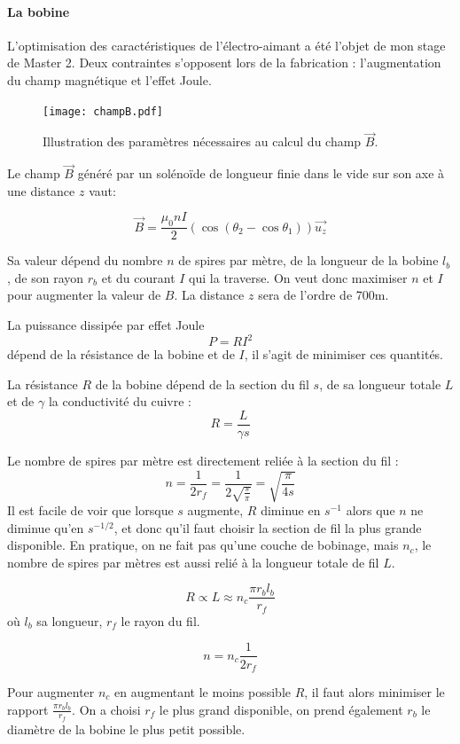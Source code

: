 \paragraph{La bobine}

	L'optimisation des caractéristiques de l'électro-aimant a été l'objet de mon stage de Master 2. 
	Deux contraintes s'opposent lors de la fabrication : l'augmentation du champ magnétique et l'effet Joule. 
	
	\begin{figure}
	\texttt{[image: champB.pdf]}
	\caption{Illustration des paramètres nécessaires au calcul du champ $\vec{B}$.}
	\end{figure}

	Le champ $\vec{B}$ généré par un solénoïde de longueur finie dans le vide sur son axe à une distance $z$ vaut:
		
		$$ \vec{B} = \frac{\mu_0 n I}{2} \left(\cos \left(\theta_2 -\cos \theta_1 \right)\right) \vec{u_z}$$
		
		Sa valeur dépend du nombre $n$ de spires par mètre, de la longueur de la bobine $l_b$, de son rayon $r_b$ et du courant $I$ qui la traverse. On veut donc maximiser $n$ et $I$ pour augmenter la valeur de $B$. La distance $z$ sera de l'ordre de 700\micro m. 
		
		La puissance dissipée par effet Joule $$P = R I^2$$ dépend de la résistance de la bobine et de $I$, il s'agit de minimiser ces quantités.
		
		La résistance $R$ de la bobine dépend de la section du fil $s$, de sa longueur totale $L$ et de $\gamma$ la conductivité du cuivre :
		 $$R = \frac{L}{\gamma s}$$
		
				
		Le nombre de spires par mètre est directement reliée à la section du fil   : $$ n = \frac{1}{2r_f} = \frac{1}{2 \sqrt{\frac{s}{\pi}}} = \sqrt{\frac{\pi}{4s}}$$  Il est facile de voir que lorsque $s$ augmente, $R$ diminue en $s^{-1}$ alors que $n$ ne diminue qu'en $s^{-1/2}$, et donc qu'il faut choisir la section de fil la plus grande disponible.
		En pratique, on ne fait pas qu'une couche de bobinage, mais $n_c$, le nombre de spires par mètres est aussi relié à la longueur totale de fil $L$.
		
		$$R \propto L \approx n_c \frac{\pi r_b l_b}{r_f}$$ où  $l_b$ sa longueur, $r_f$ le rayon du fil. 
		
		$$n = n_c \frac{1}{2r_f}$$
		
		Pour augmenter $n_c$ en augmentant le moins possible $R$, il faut alors minimiser le rapport $\frac{\pi r_b l_b}{r_f}$. On a choisi $r_f$ le plus grand disponible, on prend également $r_b$ le diamètre de la bobine le plus petit possible.
		
